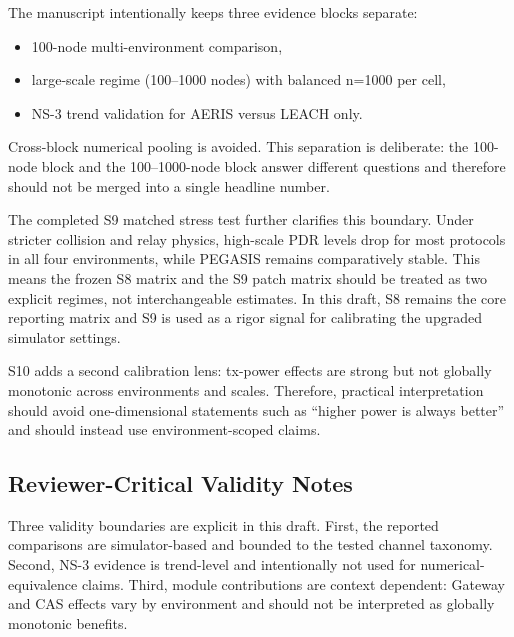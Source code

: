 \documentclass[sensors,article,submit,moreauthors,pdftex]{Definitions/mdpi}
\begin{document}
The manuscript intentionally keeps three evidence blocks separate:
\begin{itemize}
\item 100-node multi-environment comparison,
\item large-scale regime (100--1000 nodes) with balanced n=1000 per cell,
\item NS-3 trend validation for AERIS versus LEACH only.
\end{itemize}
Cross-block numerical pooling is avoided. This separation is deliberate: the 100-node block and the 100--1000-node block answer different questions and therefore should not be merged into a single headline number.

The completed S9 matched stress test further clarifies this boundary. Under stricter collision and relay physics, high-scale PDR levels drop for most protocols in all four environments, while PEGASIS remains comparatively stable. This means the frozen S8 matrix and the S9 patch matrix should be treated as two explicit regimes, not interchangeable estimates. In this draft, S8 remains the core reporting matrix and S9 is used as a rigor signal for calibrating the upgraded simulator settings.

S10 adds a second calibration lens: tx-power effects are strong but not globally monotonic across environments and scales. Therefore, practical interpretation should avoid one-dimensional statements such as ``higher power is always better'' and should instead use environment-scoped claims.

\subsection*{Reviewer-Critical Validity Notes}
Three validity boundaries are explicit in this draft. First, the reported comparisons are simulator-based and bounded to the tested channel taxonomy. Second, NS-3 evidence is trend-level and intentionally not used for numerical-equivalence claims. Third, module contributions are context dependent: Gateway and CAS effects vary by environment and should not be interpreted as globally monotonic benefits.
\end{document}
